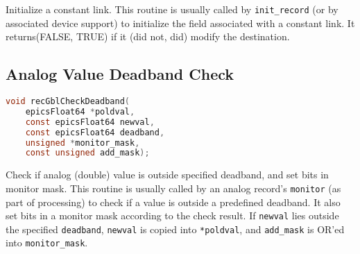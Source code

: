 Initialize a constant link.
This routine is usually called by \verb|init_record| (or by associated device support) to initialize the field associated with a constant link.
It returns(FALSE, TRUE) if it (did not, did) modify the destination.

\subsection{Analog Value Deadband Check}

\begin{lstlisting}[language=C]
void recGblCheckDeadband(
    epicsFloat64 *poldval,
    const epicsFloat64 newval,
    const epicsFloat64 deadband,
    unsigned *monitor_mask,
    const unsigned add_mask);
\end{lstlisting}

Check if analog (double) value is outside specified deadband, and set bits in monitor mask.
This routine is usually called by an analog record's \verb|monitor| (as part of processing) to check if a value is outside a predefined deadband.
It also set bits in a monitor mask according to the check result.
If \verb|newval| lies outside the specified \verb|deadband|, \verb|newval| is copied into \verb|*poldval|, and \verb|add_mask| is OR'ed into \verb|monitor_mask|.

